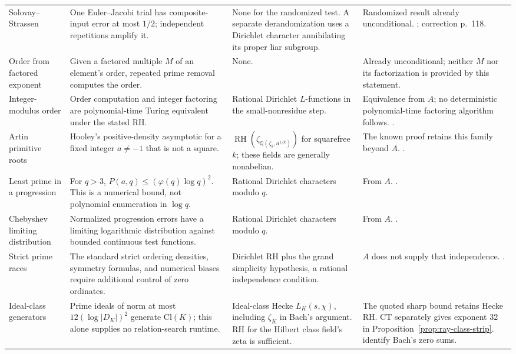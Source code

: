 \documentclass[11pt]{article}
\newcommand{\Q}{\mathbb Q}
\newcommand{\RH}{\operatorname{RH}}
\theoremstyle{definition}
\theoremstyle{remark}
\begin{document}
\begin{longtable}{@{}p{}p{}p{}p{}@{}}
Solovay--Strassen & One Euler--Jacobi trial has composite-input error at most $1/2$; independent repetitions amplify it. & None for the randomized test. A separate derandomization uses a Dirichlet character annihilating its proper liar subgroup. & Randomized result already unconditional. \citet[pp.~84--85]{SolovayStrassen1977}; correction p.~118. \\
Order from factored exponent & Given a factored multiple $M$ of an element's order, repeated prime removal computes the order. & None. & Already unconditional; neither $M$ nor its factorization is provided by this statement. \\
Integer-modulus order & Order computation and integer factoring are polynomial-time Turing equivalent under the stated RH. & Rational Dirichlet $L$-functions in the small-nonresidue step. & Equivalence from $A$; no deterministic polynomial-time factoring algorithm follows. \citet[Thm.~4, pp.~311--312; appendix pp.~315--316]{Miller1976}. \\
Artin primitive roots & Hooley's positive-density asymptotic for a fixed integer $a\ne-1$ that is not a square. & $\RH(\zeta_{\Q(\zeta_k,a^{1/k})})$ for squarefree $k$; these fields are generally nonabelian. & The known proof retains this family beyond $A$. \citet[translation pp.~40--45, 47]{Hooley1967}. \\
Least prime in a progression & For $q>3$, $P(a,q)\le(\varphi(q)\log q)^2$. This is a numerical bound, not polynomial enumeration in $\log q$. & Rational Dirichlet characters modulo $q$. & From $A$. \citet[Cor.~1.2, corrected author p.~3]{LLS2015}. \\
Chebyshev limiting distribution & Normalized progression errors have a limiting logarithmic distribution against bounded continuous test functions. & Rational Dirichlet characters modulo $q$. & From $A$. \citet[Thm.~1.1, p.~174]{RubinsteinSarnak1994}. \\
Strict prime races & The standard strict ordering densities, symmetry formulas, and numerical biases require additional control of zero ordinates. & Dirichlet RH plus the grand simplicity hypothesis, a rational independence condition. & $A$ does not supply that independence. \citet[pp.~176--177]{RubinsteinSarnak1994}. \\
Ideal-class generators & Prime ideals of norm at most $12(\log|D_K|)^2$ generate $\mathrm{Cl}(K)$; this alone supplies no relation-search runtime. & Ideal-class Hecke $L_K(s,\chi)$, including $\zeta_K$ in Bach's argument. RH for the Hilbert class field's zeta is sufficient. & The quoted sharp bound retains Hecke RH. CT separately gives exponent $32$ in Proposition~\ref{prop:ray-class-strip}. \citet[author pp.~2--3]{BDF2008} identify Bach's zero sums. \\

\end{longtable}
\end{document}
